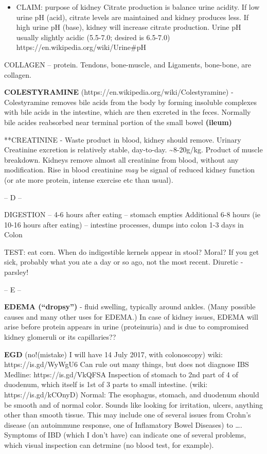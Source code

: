 \begin{itemize}
\tightlist
\item
  CLAIM: purpose of kidney Citrate production is balance urine acidity.
  If low urine pH (acid), citrate levels are maintained and kidney
  produces less. If high urine pH (base), kidney will increase citrate
  production. Urine pH usually slightly acidic (5.5-7.0; desired is
  6.5-7.0) https://en.wikipedia.org/wiki/Urine\#pH
\end{itemize}

COLLAGEN -- protein. Tendons, bone-muscle, and Ligaments, bone-bone, are
collagen.

\textbf{COLESTYRAMINE} (https://en.wikipedia.org/wiki/Colestyramine) -
Colestyramine removes bile acids from the body by forming insoluble
complexes with bile acids in the intestine, which are then excreted in
the feces. Normally bile acides reabsorbed near terminal portion of the
small bowel \textbf{(ileum)}

**CREATININE - Waste product in blood, kidney should remove. Urinary
Creatinine excretion is relatively stable, day-to-day.
\textasciitilde8-20g/kg. Product of muscle breakdown. Kidneys remove
almost all creatinine from blood, without any modification. Rise in
blood creatinine \emph{may} be signal of reduced kidney function (or ate
more protein, intense exercise etc than usual).

-- D --

DIGESTION -- 4-6 hours after eating -- stomach empties Additional 6-8
hours (ie 10-16 hours after eating) -- intestine processes, dumps into
colon 1-3 days in Colon

TEST: eat corn. When do indigestible kernels appear in stool? Moral? If
you get sick, probably what you ate a day or so ago, not the most
recent. Diuretic - parsley!

-- E --

\textbf{EDEMA (``dropsy'')} - fluid swelling, typically around ankles.
(Many possible causes and many other uses for EDEMA.) In case of kidney
issues, EDEMA will arise before protein appears in urine (proteinuria)
and is due to compromised kidney glomeruli or its capillaries??

\textbf{EGD} (no!(mistake) I will have 14 July 2017, with colonoscopy)
wiki: https://is.gd/WyWgU6 Can rule out many things, but does not
diagnose IBS Medline: https://is.gd/VkQFSA Inspection of stomach to 2nd
part of 4 of duodenum, which itself is 1st of 3 parts to small
intestine. (wiki: https://is.gd/kCOnyD) Normal: The esophagus, stomach,
and duodenum should be smooth and of normal color. Sounds like looking
for irritation, ulcers, anything other than smooth tissue. This may
include one of several issues from Crohn's disease (an autoimmune
response, one of Inflamatory Bowel Diseases) to \ldots. Symptoms of IBD
(which I don't have) can indicate one of several problems, which visual
inspection can detrmine (no blood test, for example).

